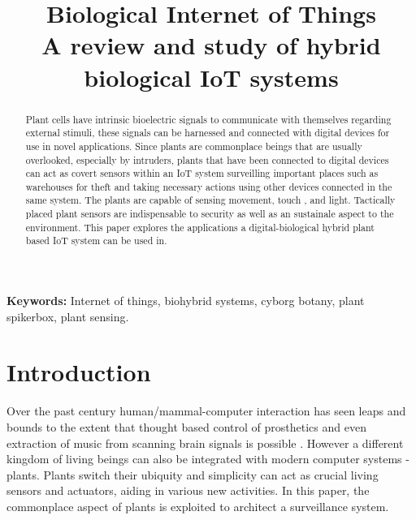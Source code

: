 \documentclass[conference]{IEEEtran}
\begin{document}
\title{Biological Internet of Things \\
        \large A review and study of hybrid biological IoT systems}

\author{
\and
{}

}
\maketitle

\begin{abstract}

Plant cells have intrinsic bioelectric signals to communicate with 
themselves regarding external stimuli, these signals can be harnessed 
and connected with digital devices for use in novel applications. 
Since plants are commonplace beings that are usually overlooked, especially
by intruders, plants that have been connected to digital devices can 
act as covert sensors within an IoT system surveilling important places 
such as warehouses for theft and taking necessary actions using other 
devices connected in the same system. The plants are capable of sensing
movement, touch , and light. Tactically placed plant sensors are 
indispensable to security as well as an sustainale aspect to the environment.
This paper explores the applications a digital-biological hybrid plant
based IoT system can be used in.

\end{abstract}

\begin{IEEEkeywords}
\textbf{Keywords:} Internet of things, biohybrid systems, cyborg botany, 
plant spikerbox, plant sensing.
\end{IEEEkeywords}

\section{Introduction}
    Over the past century human/mammal-computer interaction has seen leaps
    and bounds to the extent that thought based control of prosthetics and 
    even extraction of music from scanning brain signals is possible \cite{zotero-65} . 
    However a different kingdom of living beings can also be integrated with 
    modern computer systems - plants. Plants switch their ubiquity and
    simplicity can act as crucial living sensors and actuators, aiding in 
    various new activities. In this paper, the commonplace aspect of plants
    is exploited to architect a surveillance system. 
    
\end{document}
